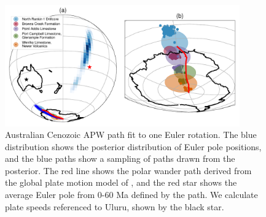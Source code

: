 \documentclass[preprint,12pt,authoryear]{elsarticle}
\begin{document}
\begin{figure}
\includegraphics[width=0.9\textwidth]{figures/australia/australia_paths_1.pdf}
\caption[Australian Cenozoic APW path fit to one Euler rotation.]{Australian Cenozoic APW path fit to one Euler rotation. The blue distribution shows the posterior distribution of Euler pole positions, and the blue paths show a sampling of paths drawn from the posterior. The red line shows the polar wander path derived from the global plate motion model of \citet{seton2012global}, and the red star shows the average Euler pole from 0-60 Ma defined by the \citet{seton2012global} path. We calculate plate speeds referenced to Uluru, shown by the black star.}
\label{fig:australia_paths_1}
\end{figure}
\end{document}
